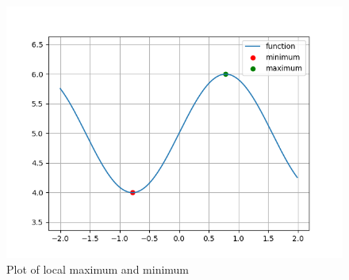 \documentclass[journal]{IEEEtran}
\begin{document}
\begin{figure}[ht]
    \centering
    \includegraphics[width=\columnwidth]{figs/plot.png}
    \caption{Plot of local maximum and minimum}
    \label{fig:Plot1}
    \end{figure}
\end{document}
